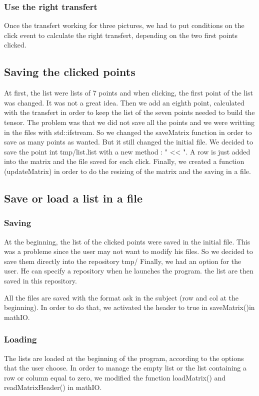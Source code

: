 \documentclass{report}
\begin{document}
\subsubsection{Use the right transfert}
Once the transfert working for three pictures, we had to put conditions on the click event to calculate the right transfert, depending on the two first points clicked.  

 
\textcolor{subtitle}{\subsection{Saving the clicked points}}
At first, the list were lists of 7 points and when clicking, the first point of the list was changed. It was not a great idea. 
Then we add an eighth point, calculated with the transfert in order to keep the list of the seven points needed to build the tensor. The problem was that we did not save all the points and we were writting in the files with std::ifstream. So we changed the saveMatrix function in order to save as many points as wanted. But it still changed the initial file. 
We decided to save the point int tmp/list.list with a new method : " << ". A row is just added into the matrix and the file saved for each click. 
Finally, we created a function (updateMatrix) in order to do the resizing of the matrix and the saving in a file. 

\textcolor{subtitle}{\subsection{Save or load a list in a file}}
\subsubsection{Saving}
At the beginning, the list of the clicked points were saved in the initial file. This was a probleme since the user may not want to modify his files. 
So we decided to save them directly into the repository tmp/ 
Finally, we had an option for the user. He can specify a repository when he launches the program. the list are then saved in this repository. 

All the files are saved with the format ask in the subject (row and col at the beginning). In order to do that, we activated the header to true in saveMatrix()in mathIO. 

\subsubsection{Loading}
The lists are loaded at the beginning of the program, according to the options that the user choose. In order to manage the empty list or the list containing a row or column equal to zero, we modified the function loadMatrix() and readMatrixHeader() in mathIO. 
\end{document}
